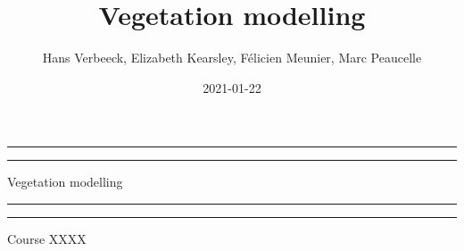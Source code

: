 \documentclass[
  oneside]{book}
\title{Vegetation modelling}
\author{Hans Verbeeck, Elizabeth Kearsley, Félicien Meunier, Marc Peaucelle}
\date{2021-01-22}
\begin{document}
\maketitle

\newcommand{\plogo}{\fbox{$\mathcal{PL}$}} %
\frontmatter


\begin{titlepage} %

	\centering %
	
	\scshape %
	
	\vspace*{\baselineskip} %
	
	
	\vspace{8\baselineskip}
	
	\rule{\textwidth}{1.6pt}\vspace*{-\baselineskip}\vspace*{2pt} %
	\rule{\textwidth}{0.4pt} %
	
	\vspace{0.75\baselineskip} %
	
	{\LARGE Vegetation modelling\\} %
	
	\vspace{0.75\baselineskip} %
	
	\rule{\textwidth}{0.4pt}\vspace*{-\baselineskip}\vspace{3.2pt} %
	\rule{\textwidth}{1.6pt} %
	
	\vspace{2\baselineskip} %
	
	
	Course XXXX %
	
	\vspace*{3\baselineskip} %
	
	

\end{titlepage}
\end{document}
